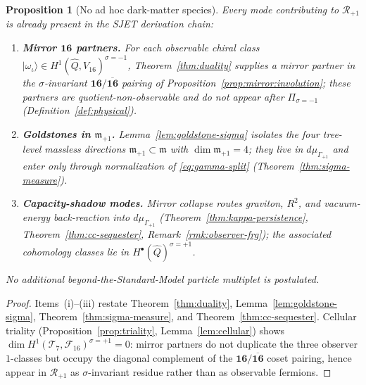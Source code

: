 \documentclass[11pt]{article}
\theoremstyle{plain}
\newtheorem{proposition}[theorem]{Proposition}
\theoremstyle{definition}
\theoremstyle{remark}
\numberwithin{equation}{section}
\begin{document}
\begin{proposition}[No ad hoc dark-matter species]\label{prop:dm-no-new}
Every mode contributing to $\mathcal{R}_{+1}$ is already present in the
SJET derivation chain:
\begin{enumerate}[label=(\roman*),leftmargin=*]
  \item \textbf{Mirror $\mathbf{16}$ partners.} For each observable chiral
    class $|\omega_\iota\rangle\in H^1(\hat Q,V_{16})^{\sigma=-1}$,
    Theorem~\ref{thm:duality} supplies a mirror partner in the
    $\sigma$-invariant $\mathbf{16}/\overline{\mathbf{16}}$ pairing of
    Proposition~\ref{prop:mirror:involution}; these partners are
    quotient-non-observable and do not appear after
    $\Pi_{\sigma=-1}$ (Definition~\ref{def:physical}).
  \item \textbf{Goldstones in $\mathfrak{m}_{+1}$.} Lemma~\ref{lem:goldstone-sigma}
    isolates the four tree-level massless directions
    $\mathfrak{m}_{+1}\subset\mathfrak{m}$ with
    $\dim\mathfrak{m}_{+1}=4$; they live in $d\mu_{\Gamma_{+1}}$ and enter
    only through normalization of \eqref{eq:gamma-split}
    (Theorem~\ref{thm:sigma-measure}).
  \item \textbf{Capacity-shadow modes.} Mirror collapse routes graviton,
    $R^2$, and vacuum-energy back-reaction into $d\mu_{\Gamma_{+1}}$
    (Theorem~\ref{thm:kappa-persistence}, Theorem~\ref{thm:cc-sequester},
    Remark~\ref{rmk:observer-frg}); the associated cohomology classes lie in
    $H^\bullet(\hat Q)^{\sigma=+1}$.
\end{enumerate}
No additional beyond-the-Standard-Model particle multiplet is postulated.
\end{proposition}

\begin{proof}
Items~(i)--(iii) restate Theorem~\ref{thm:duality},
Lemma~\ref{lem:goldstone-sigma}, Theorem~\ref{thm:sigma-measure}, and
Theorem~\ref{thm:cc-sequester}. Cellular triality
(Proposition~\ref{prop:triality}, Lemma~\ref{lem:cellular}) shows
$\dim H^1(\mathcal{T}_7,\mathcal{F}_{16})^{\sigma=+1}=0$: mirror partners do
not duplicate the three observer $1$-classes but occupy the diagonal complement
of the $\mathbf{16}/\overline{\mathbf{16}}$ coset pairing, hence appear in
$\mathcal{R}_{+1}$ as $\sigma$-invariant residue rather than as observable
fermions.
\end{proof}
\end{document}
